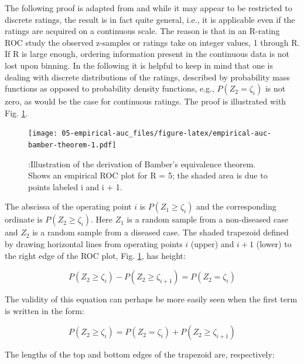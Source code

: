 \documentclass[
]{book}
\begin{document}
The following proof is adapted from \citep{bamber1975area} and while it may appear to be restricted to discrete ratings, the result is in fact quite general, i.e., it is applicable even if the ratings are acquired on a continuous scale. The reason is that in an R-rating ROC study the observed z-samples or ratings take on integer values, 1 through R. If R is large enough, ordering information present in the continuous data is not lost upon binning. In the following it is helpful to keep in mind that one is dealing with discrete distributions of the ratings, described by probability mass functions as opposed to probability density functions, e.g., \(P(Z_2 = \zeta_i)\) is not zero, as would be the case for continuous ratings. The proof is illustrated with Fig. \ref{fig:empirical-auc-bamber-theorem}.

\begin{figure}
\centering
\texttt{[image: 05-empirical-auc\_files/figure-latex/empirical-auc-bamber-theorem-1.pdf]}
\caption{\label{fig:empirical-auc-bamber-theorem}:Illustration of the derivation of Bamber's equivalence theorem. Shows an empirical ROC plot for R = 5; the shaded area is due to points labeled i and i + 1.}
\end{figure}

The abscissa of the operating point \(i\) is \(P(Z_1 \geq \zeta_i)\) and the corresponding ordinate is \(P(Z_2 \geq \zeta_i)\). Here \(Z_1\) is a random sample from a non-diseased case and \(Z_2\) is a random sample from a diseased case. The shaded trapezoid defined by drawing horizontal lines from operating points \(i\) (upper) and \(i+1\) (lower) to the right edge of the ROC plot, Fig. \ref{fig:empirical-auc-bamber-theorem}, has height:

\begin{equation}
P\left ( Z_2 \geq \zeta_i \right ) - P\left ( Z_2 \geq \zeta_{i+1} \right ) = P\left ( Z_2 = \zeta_i \right )
\label{eq:empirical-auc-bamber-theorem-proof1}
\end{equation}

The validity of this equation can perhaps be more easily seen when the first term is written in the form:

\begin{equation}
P\left ( Z_2 \geq \zeta_i \right ) = P\left ( Z_2 = \zeta_i \right )  + P\left ( Z_2 \geq \zeta_{i+1} \right )
\label{eq:empirical-auc-bamber-theorem-proof2}
\end{equation}

The lengths of the top and bottom edges of the trapezoid are, respectively:
\end{document}
